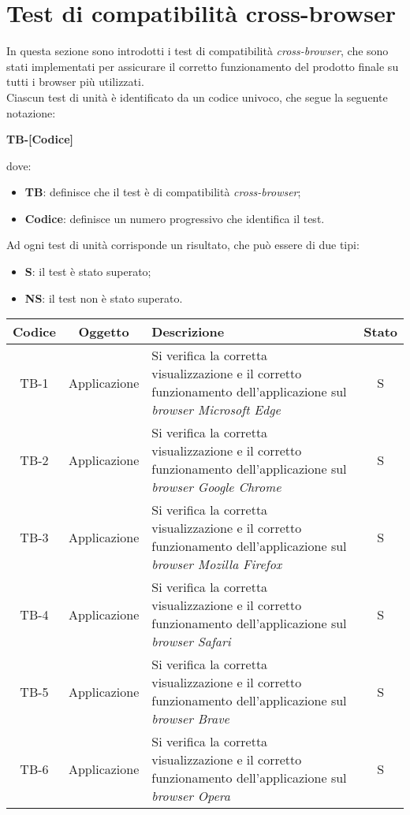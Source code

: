 \section{Test di compatibilità cross-browser}\label{sec:test-compatibilita-cross-browser}
In questa sezione sono introdotti i test di compatibilità \textit{cross-browser}, che sono stati implementati per assicurare il corretto funzionamento del prodotto finale su tutti i browser più utilizzati.\\
Ciascun test di unità è identificato da un codice univoco, che segue la seguente notazione:
\begin{center}
  \textbf{TB-[Codice]}
\end{center}
dove:
\begin{itemize}
  \item \textbf{TB}: definisce che il test è di compatibilità \textit{cross-browser};
  \item \textbf{Codice}: definisce un numero progressivo che identifica il test.
\end{itemize}
Ad ogni test di unità corrisponde un risultato, che può essere di due tipi:
\begin{itemize}
  \item \textbf{S}: il test è stato superato;
  \item \textbf{NS}: il test non è stato superato.
\end{itemize}

\begin{center}
  \label{tab:test-compatibilita-cross-browser}
  \begin{longtable}{|c|c|p{}|c|}
  \hline
  \textbf{Codice} & \textbf{Oggetto} & \textbf{Descrizione} & \textbf{Stato}\\
  \hline
  TB-1 &Applicazione &Si verifica la corretta visualizzazione e il corretto funzionamento dell'applicazione sul \textit{browser Microsoft Edge} &S \\
  \hline
  TB-2 &Applicazione  &Si verifica la corretta visualizzazione e il corretto funzionamento dell'applicazione  sul \textit{browser Google Chrome} &S \\
  \hline
  TB-3 &Applicazione &Si verifica la corretta visualizzazione e il corretto funzionamento dell'applicazione  sul \textit{browser Mozilla Firefox} &S \\
  \hline
  TB-4 &Applicazione &Si verifica la corretta visualizzazione e il corretto funzionamento dell'applicazione  sul \textit{browser Safari} &S \\
  \hline
  TB-5 &Applicazione &Si verifica la corretta visualizzazione e il corretto funzionamento dell'applicazione  sul \textit{browser Brave} &S \\
  \hline
  TB-6 &Applicazione &Si verifica la corretta visualizzazione e il corretto funzionamento dell'applicazione  sul \textit{browser Opera} &S \\
  \hline
\end{longtable}
\end{center}
